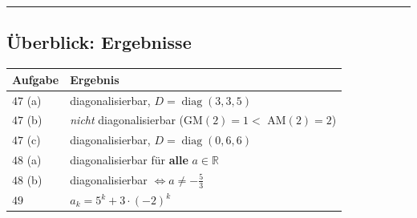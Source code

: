 \documentclass[a4paper,12pt]{article}
\begin{document}
\bigskip
\hrule
\bigskip

\subsection*{\"Uberblick: Ergebnisse}

\begin{center}
\begin{tabular}{@{}ll@{}}
\toprule
Aufgabe & Ergebnis \\
\midrule
$47$ (a) & diagonalisierbar, $D = \operatorname{diag}(3,3,5)$ \\
$47$ (b) & \emph{nicht} diagonalisierbar (GM$(2)=1 <$ AM$(2)=2$) \\
$47$ (c) & diagonalisierbar, $D = \operatorname{diag}(0,6,6)$ \\[2pt]
$48$ (a) & diagonalisierbar f\"ur \textbf{alle} $a \in \mathbb{R}$ \\
$48$ (b) & diagonalisierbar $\Leftrightarrow a \neq -\tfrac{5}{3}$ \\[2pt]
$49$ & $a_k = 5^k + 3\cdot(-2)^k$ \\
\bottomrule
\end{tabular}
\end{center}
\end{document}
